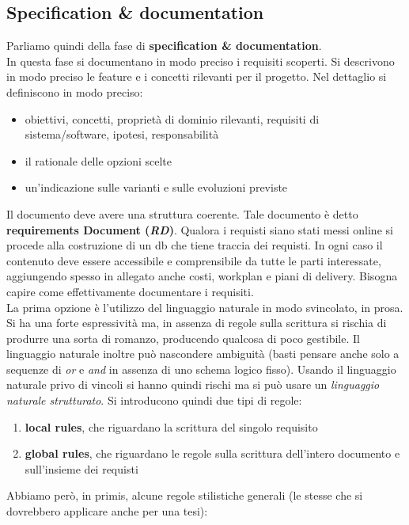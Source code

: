 \documentclass[a4paper,12pt, oneside]{book}
\begin{document}
\subsection{Specification \& documentation}
Parliamo quindi della fase di \textbf{specification \& documentation}.\\
In questa fase si documentano in modo preciso i requisiti scoperti. Si
descrivono in modo preciso le feature e i concetti rilevanti per il
progetto. Nel dettaglio si definiscono in modo preciso:
\begin{itemize}
  \item obiettivi, concetti, proprietà di dominio rilevanti, requisiti di
  sistema/software, ipotesi, responsabilità 
  \item il rationale delle opzioni scelte
  \item un'indicazione sulle varianti e sulle evoluzioni previste
\end{itemize}
Il documento deve avere una struttura coerente. Tale documento è detto
\textbf{requirements Document (\textit{RD})}. Qualora i requisti siano stati
messi online si procede alla costruzione di un db che tiene traccia dei
requisti. In ogni caso il contenuto deve essere accessibile e comprensibile da
tutte le parti interessate, aggiungendo spesso in allegato anche costi, workplan
e piani di delivery. Bisogna capire come effettivamente documentare i
requisiti.\\
La prima opzione è l'utilizzo del linguaggio naturale in modo
svincolato, in prosa. Si ha una forte espressività ma, in assenza di regole
sulla scrittura si rischia di produrre una sorta di romanzo, producendo qualcosa
di poco gestibile. Il linguaggio naturale inoltre può nascondere ambiguità
(basti pensare anche solo a sequenze di \textit{or} e \textit{and} in assenza di
uno schema logico fisso). Usando il linguaggio naturale privo di vincoli si
hanno quindi rischi ma si può usare un \textit{linguaggio naturale
  strutturato}. Si introducono quindi due tipi di regole:
\begin{enumerate}
  \item \textbf{local rules}, che riguardano la scrittura del singolo requisito
  \item \textbf{global rules}, che riguardano le regole sulla scrittura
  dell'intero documento e sull'insieme dei requisti
\end{enumerate}
Abbiamo però, in primis, alcune regole stilistiche generali (le stesse che si
dovrebbero applicare anche per una tesi):
\end{document}
